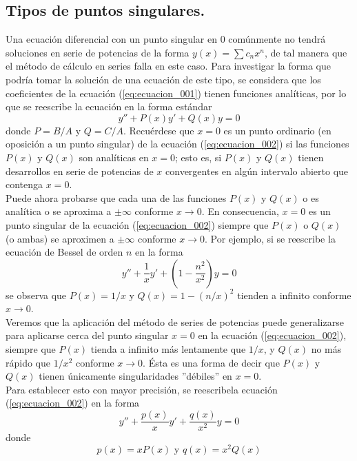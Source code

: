\subsection{Tipos de puntos singulares.}
Una ecuación diferencial con un punto singular en $0$ comúnmente no tendrá soluciones en serie de potencias de la forma $y(x) = \sum c_{n} x^{n}$, de tal manera que el método de cálculo en series falla en este caso. Para investigar la forma que podría tomar la solución de una ecuación de este tipo, se considera que los coeficientes de la ecuación (\ref{eq:ecuacion_001}) tienen funciones analíticas, por lo que se reescribe la ecuación en la forma estándar
\begin{equation}
y'' + P(x) y' + Q(x) y = 0
\label{eq:ecuacion_002}
\end{equation}
donde $P = B/A$ y $Q = C/A$. Recuérdese que $x = 0$ es un punto ordinario (en oposición a un punto singular) de la ecuación (\ref{eq:ecuacion_002}) si las funciones $P(x)$ y $Q(x)$ son analíticas en $x = 0$; esto es, si $P(x)$ y $Q(x)$ tienen desarrollos en serie de potencias de $x$ convergentes en algún intervalo abierto que contenga $x = 0$.
\\
Puede ahora probarse que cada una de las funciones $P(x)$ y $Q(x)$ o es analítica o se aproxima a $\pm \infty$ conforme $x  \to 0$. En consecuencia, $x = 0$ es un punto singular de la ecuación (\ref{eq:ecuacion_002}) siempre que $P(x)$ o
$Q(x)$ (o ambas) se aproximen a $\pm \infty$ conforme $x \to 0$. Por ejemplo, si se reescribe la ecuación de Bessel de orden $n$ en la forma
\[ y'' + \dfrac{1}{x} y' + \left( 1 - \dfrac{n^{2}}{x^{2}} \right) y  = 0\]
se observa que $P(x) = 1/x$ y $Q(x) = 1 - (n/x)^{2}$ tienden a infinito conforme $x \to 0$.
\\
Veremos que la aplicación del método de series de potencias puede generalizarse para aplicarse cerca del punto singular $x = 0$ en la ecuación (\ref{eq:ecuacion_002}), siempre que $P(x)$ tienda a infinito más lentamente que $1/x$, y $Q(x)$ no más rápido que $1/x^{2}$ conforme $x \to 0$. Ésta es una forma de decir que $P(x)$ y $Q(x)$ tienen únicamente singularidades ''débiles'' en $x = 0$.
\\
Para establecer esto con mayor precisión, se reescribela ecuación (\ref{eq:ecuacion_002}) en la forma
\begin{equation}
y'' + \dfrac{p(x)}{x} y' + \dfrac{q(x)}{x^{2}} y = 0
\label{eq:ecuacion_003}
\end{equation}
donde
\begin{equation}
p(x) = x P(x) \mbox{ y } q(x) = x^{2} Q(x)
\label{eq:ecuacion_004}
\end{equation}
